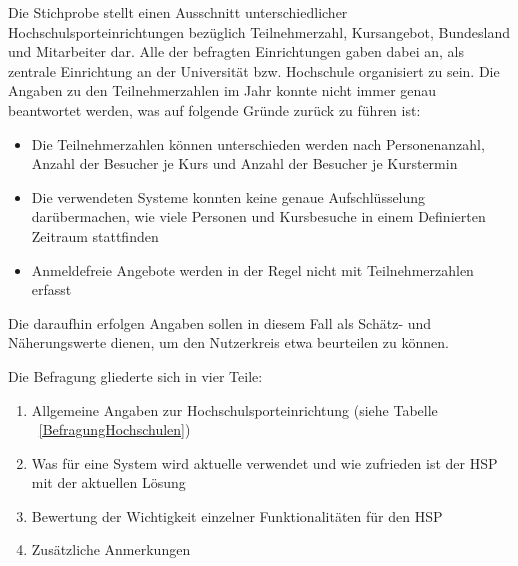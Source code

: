 Die Stichprobe stellt einen Ausschnitt unterschiedlicher Hochschulsporteinrichtungen bezüglich Teilnehmerzahl, Kursangebot, Bundesland und Mitarbeiter dar. Alle der befragten Einrichtungen gaben dabei an, als zentrale Einrichtung an der Universität bzw. Hochschule organisiert zu sein. Die Angaben zu den Teilnehmerzahlen im Jahr konnte nicht immer genau beantwortet werden, was auf folgende Gründe zurück zu führen ist:
\begin{itemize}
\item Die Teilnehmerzahlen können unterschieden werden nach Personenanzahl, Anzahl der Besucher je Kurs und Anzahl der Besucher je Kurstermin
\item Die verwendeten Systeme konnten keine genaue Aufschlüsselung darübermachen, wie viele Personen und Kursbesuche in einem Definierten Zeitraum stattfinden
\item Anmeldefreie Angebote werden in der Regel nicht mit Teilnehmerzahlen erfasst
\end{itemize}

Die daraufhin erfolgen Angaben sollen in diesem Fall als Schätz- und Näherungswerte dienen, um den Nutzerkreis etwa beurteilen zu können. 

Die Befragung gliederte sich in vier Teile:

\begin{enumerate}
\item Allgemeine Angaben zur Hochschulsporteinrichtung (siehe Tabelle ~\ref{BefragungHochschulen})
\item Was für eine System wird aktuelle verwendet und wie zufrieden ist der HSP mit der aktuellen Lösung
\item Bewertung der Wichtigkeit einzelner Funktionalitäten für den HSP
\item Zusätzliche Anmerkungen
\end{enumerate}

